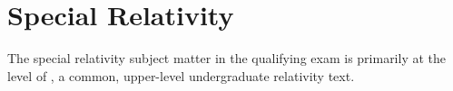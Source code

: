\newpage
\section{Special Relativity}
\label{sec:specrel}
The special relativity subject matter in the qualifying exam is primarily at the level of \cite{ohanianModernPhysics1995}, a common, upper-level undergraduate relativity text.

